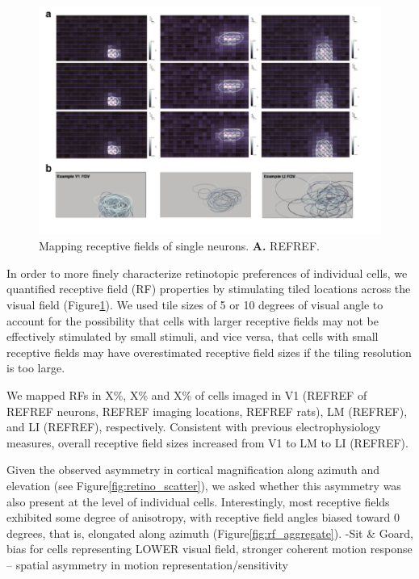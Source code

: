 \begin{figure}[t!]
    \includegraphics[width=\textwidth]{figures/chapter_3/rf_examples/rf_examples.pdf}
    \vspace{.1in}
    \caption[Receptive field mapping]{Mapping receptive fields of single neurons. \textbf{A.} REFREF.
    \label{fig:rf_examples}}
\end{figure}

In order to more finely characterize retinotopic preferences of individual cells, we quantified receptive field (RF) properties by stimulating tiled locations across the visual field (Figure\ref{fig:rf_examples}). We used tile sizes of 5 or 10 degrees of visual angle to account for the possibility that cells with larger receptive fields may not be effectively stimulated by small stimuli, and vice versa, that  cells with small receptive fields may have overestimated receptive field sizes if the tiling resolution is too large.

We mapped RFs in X\%, X\% and X\% of cells imaged in V1 (REFREF of REFREF neurons, REFREF imaging locations, REFREF rats), LM (REFREF), and LI (REFREF), respectively. Consistent with previous electrophysiology measures\cite{Vermaercke2014, Tafazoli2017}, overall receptive field sizes increased from V1 to LM to LI (REFREF).

Given the observed asymmetry in cortical magnification along azimuth and elevation (see Figure\ref{fig:retino_scatter}), we asked whether this asymmetry was also present at the level of individual cells. Interestingly, most receptive fields exhibited some degree of anisotropy, with receptive field angles biased toward 0 degrees, that is, elongated along azimuth (Figure\ref{fig:rf_aggregate}). 
-Sit & Goard, bias for cells representing LOWER visual field, stronger coherent motion response -- spatial asymmetry in motion representation/sensitivity

